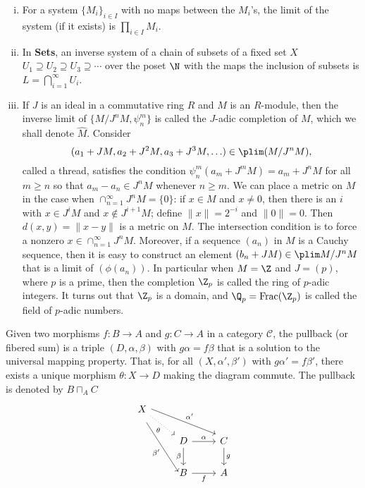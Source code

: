\begin{ex} \label{ex:padic} \hfill
	\begin{enumerate}[(i)]
	\item For a system $\{M_i\}_{i \in I}$ with no maps between the $M_i$'s, the limit of the system (if it exists) is $\prod_{i \in I} M_i$. \xqed
	\item In \textbf{Sets}, an inverse system of a chain of subsets of a fixed set $X$ $U_1 \supseteq U_2 \supseteq U_3 \supseteq \cdots$ over the poset $\N$ with the maps the inclusion of subsets is $L= \bigcap_{i=1}^\infty U_i$. \xqed
	\item If $J$ is an ideal in a commutative ring $R$ and $M$ is an $R$-module, then the inverse limit of $\{M/J^nM, \psi_n^m\}$ is called the $J$-adic completion of $M$, which we shall denote $\hat{M}$. Consider
		\[
		(a_1+JM, a_2+J^2M, a_3+J^3M, \ldots) \in \plim(M/J^nM),
		\]
	called a thread, satisfies the condition $\psi_n^m(a_m+J^mM)= a_m+J^nM$ for all $m \geq n$ so that $a_m - a_n \in J^nM$ whenever $n \geq m$. We can place a metric on $M$ in the case when $\cap_{n=1}^\infty J^nM= \{0\}$: if $x \in M$ and $x \neq 0$, then there is an $i$ with $x \in J^iM$ and $x \notin J^{i+1}M$; define $\|x\|=2^{-i}$ and $\|0\|=0$. Then $d(x,y)=\|x-y\|$ is a metric on $M$. The intersection condition is to force a nonzero $x \in \cap_{n=1}^\infty J^nM$. Moreover, if a sequence $(a_n)$ in $M$ is a Cauchy sequence, then it is easy to construct an element $(b_n+JM) \in \plim M/J^nM$ that is a limit of $(\phi(a_n))$. In particular when $M=\Z$ and $J=(p)$, where $p$ is a prime, then the completion $\Z_p$ is called the ring of $p$-adic integers. It turns out that $\Z_p$ is a domain, and $\Q_p=\text{Frac}(\Z_p)$ is called the field of $p$-adic numbers. 
	\end{enumerate} \xqed
\end{ex}


\begin{dfn}[Pullback]
Given two morphisms $f: B \to A$ and $g: C \to A$ in a category $\mathcal{C}$, the pullback (or fibered sum) is a triple $(D,\alpha,\beta)$ with $g\alpha=f\beta$ that is a solution to the universal mapping property. That is, for all $(X,\alpha',\beta')$ with $g\alpha'=f\beta'$, there exists a unique morphism $\theta: X \to D$ making the diagram commute. The pullback is denoted by $B \sqcap_A C$
	\[
	\begin{tikzcd}
	X \arrow[yshift=1ex]{drr}{\alpha'} \arrow[dotted,swap]{dr}{\theta} \arrow[swap,yshift= -1.5ex]{ddr}{\beta'} & & \\
	& D \arrow{r}{\alpha} \arrow[swap]{d}{\beta} & C \arrow{d}{g} \\
	& B \arrow[swap]{r}{f} & A
	\end{tikzcd}
	\]
\end{dfn}


